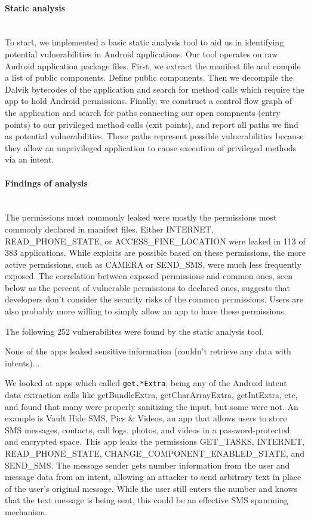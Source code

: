 \documentclass[12pt,a4paper]{article} \usepackage{verbatim}
\begin{document}
\paragraph{Static analysis} ~\\

To start, we implemented a basic static analysis tool to aid us in identifying
potential vulnerabilities in Android applications. Our tool operates on raw
Android application package files. First, we extract the manifest file and
compile a list of public components. Define public components. Then we decompile
the Dalvik bytecodes of the application and search for method calls which
require the app to hold Android permissions. Finally, we construct a control
flow graph of the application and search for paths connecting our open compnents
(entry points) to our privileged method calls (exit points), and report all
paths we find as potential vulnerabilities. These paths represent possible
vulnerabilities because they allow an unprivileged application to cause
execution of privileged methods via an intent.

\paragraph{Findings of analysis} ~\\

The permissions most commonly leaked were mostly the permissions most commonly
declared in manifest files. Either INTERNET, READ\_PHONE\_STATE, or
ACCESS\_FINE\_LOCATION were leaked in 113 of 383 applications. While exploits
are possible based on these permissions, the more active permissions, such as
CAMERA or SEND\_SMS, were much less frequently exposed. The correlation between
exposed permissions and common ones, seen below as the percent of vulnerable
permissions to declared ones, suggests that developers don't consider the
security risks of the common permissions. Users are also probably more willing
to simply allow an app to have these permissions.

The following 252 vulnerabilites were found by the static analysis tool.



None of the apps leaked sensitive information (couldn't retrieve any data with
intents)...

We looked at apps which called \texttt{get.*Extra}, being any of the Android
intent data extraction calls like getBundleExtra, getCharArrayExtra,
getIntExtra, etc, and found that many were properly sanitizing the input, but
some were not. An example is Vault Hide SMS, Pics \& Videos, an app that allows
users to store SMS messages, contacts, call logs, photos, and videos in a
password-protected and encrypted space. This app leaks the permissions
GET\_TASKS, INTERNET, READ\_PHONE\_STATE, CHANGE\_COMPONENT\_ENABLED\_STATE, and
SEND\_SMS. The message sender gets number information from the user and message
data from an intent, allowing an attacker to send arbitrary text in place of the
user's original message. While the user still enters the number and knows that
the text message is being sent, this could be an effective SMS spamming
mechanism.
\end{document}
